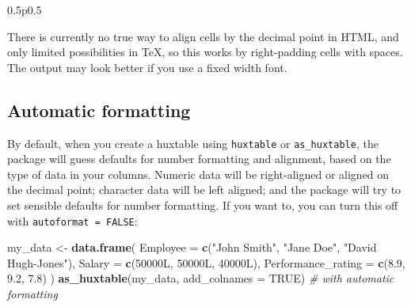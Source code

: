 \documentclass[]{article}
\newenvironment{Shaded}{\begin{snugshade}}{\end{snugshade}}
\newcommand{\KeywordTok}[1]{\textcolor[rgb]{0.13,0.29,0.53}{\textbf{#1}}}
\newcommand{\DataTypeTok}[1]{\textcolor[rgb]{0.13,0.29,0.53}{#1}}
\newcommand{\FloatTok}[1]{\textcolor[rgb]{0.00,0.00,0.81}{#1}}
\newcommand{\StringTok}[1]{\textcolor[rgb]{0.31,0.60,0.02}{#1}}
\newcommand{\CommentTok}[1]{\textcolor[rgb]{0.56,0.35,0.01}{\textit{#1}}}
\newcommand{\OtherTok}[1]{\textcolor[rgb]{0.56,0.35,0.01}{#1}}
\newcommand{\NormalTok}[1]{#1}
\begin{document}
\begin{table}[h]
\begin{tabularx}{0.5\textwidth}{p{}}
 \tabularnewline[-0.5pt]


\end{tabularx}
\end{table}

\FloatBarrier

There is currently no true way to align cells by the decimal point in
HTML, and only limited possibilities in TeX, so this works by
right-padding cells with spaces. The output may look better if you use a
fixed width font.

\subsection{Automatic formatting}\label{automatic-formatting}

By default, when you create a huxtable using \texttt{huxtable} or
\texttt{as\_huxtable}, the package will guess defaults for number
formatting and alignment, based on the type of data in your columns.
Numeric data will be right-aligned or aligned on the decimal point;
character data will be left aligned; and the package will try to set
sensible defaults for number formatting. If you want to, you can turn
this off with \texttt{autoformat\ =\ FALSE}:

\begin{Shaded}
\begin{Highlighting}[]
\NormalTok{my_data <-}\StringTok{ }\KeywordTok{data.frame}\NormalTok{(}
        \DataTypeTok{Employee           =} \KeywordTok{c}\NormalTok{(}\StringTok{"John Smith"}\NormalTok{, }\StringTok{"Jane Doe"}\NormalTok{, }\StringTok{"David Hugh-Jones"}\NormalTok{), }
        \DataTypeTok{Salary             =} \KeywordTok{c}\NormalTok{(50000L, 50000L, 40000L),}
        \DataTypeTok{Performance_rating =} \KeywordTok{c}\NormalTok{(}\FloatTok{8.9}\NormalTok{, }\FloatTok{9.2}\NormalTok{, }\FloatTok{7.8}\NormalTok{)  }
\NormalTok{      )}
\KeywordTok{as_huxtable}\NormalTok{(my_data, }\DataTypeTok{add_colnames =} \OtherTok{TRUE}\NormalTok{) }\CommentTok{# with automatic formatting}
\end{Highlighting}
\end{Shaded}
\end{document}
